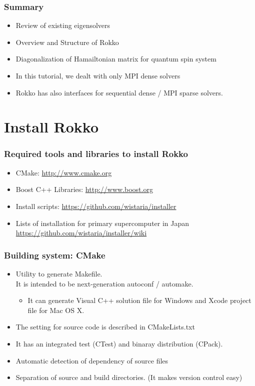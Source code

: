 \begin{frame}[c,fragile]
  \frametitle{Summary}
 \begin{itemize}
    \setlength{\itemsep}{1em}
  \item Review of existing eigensolvers
  \item Overview and Structure of Rokko
  \item Diagonalization of Hamailtonian matrix for quantum spin system
  \end{itemize}

  \begin{itemize}
  \item In this tutorial, we dealt with only MPI dense solvers
  \item Rokko has also interfaces for sequential dense / MPI sparse solvers.
  \end{itemize}
\end{frame}
  
  
\section{Install Rokko}

\begin{frame}
  \frametitle{Required tools and libraries to install Rokko}
  \begin{itemize}
    \setlength{\itemsep}{1em}
  \item CMake: \url{http://www.cmake.org}
  \item Boost C++ Libraries: \url{http://www.boost.org}
  \item Install scripts: \url{https://github.com/wistaria/installer}
  \item Lists of installation for primary supercomputer in Japan \\
    \url{https://github.com/wistaria/installer/wiki}
  \end{itemize}
\end{frame}


\begin{frame}
  \frametitle{Building system: CMake}
  \begin{itemize}
    \setlength{\itemsep}{1em}
  \item Utility to generate Makefile.\\
  It is intended to be next-generation autoconf / automake.
    \begin{itemize}
    \item It can generate Visual C++ solution file for Windows and Xcode project file for Mac OS X.
    \end{itemize}
  \item The setting for source code is described in CMakeLists.txt
  \item It has an integrated test (CTest) and binaray distribution (CPack).
  \item Automatic detection of dependency of source files
  \item Separation of source and build directories. (It makes version control easy)
  \end{itemize}
\end{frame}



